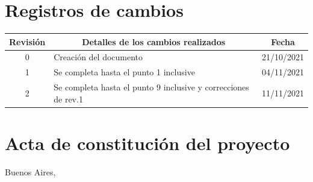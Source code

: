 \documentclass[
11pt, %
codirector, %
]{charter}
\begin{document}
\maketitle
\thispagestyle{empty}
\pagebreak


\thispagestyle{empty}
{\setlength{\parskip}{0pt}
\tableofcontents{}
}
\pagebreak


\section*{Registros de cambios}
\label{sec:registro}


\begin{table}[ht]
\label{tab:registro}
\centering
\begin{tabularx}{\linewidth}{@{}|c|X|c|@{}}
\hline
\rowcolor[HTML]{C0C0C0} 
Revisión & \multicolumn{1}{c|}{\cellcolor[HTML]{C0C0C0}Detalles de los cambios realizados} & Fecha      \\ \hline
0      & Creación del documento                                 & 21/10/2021 \\ \hline %
1      & Se completa hasta el punto 1 inclusive                 & 04/11/2021 \\ \hline
2      & Se completa hasta el punto 9 inclusive y correcciones de rev.1	& 11/11/2021 \\ \hline
\end{tabularx}
\end{table}

\pagebreak



\section*{Acta de constitución del proyecto}
\label{sec:acta}

\begin{flushright}
Buenos Aires, \fechaInicioName
\end{flushright}
\end{document}
